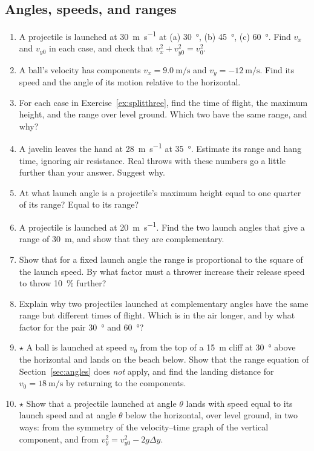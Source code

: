 \documentclass[11pt,twoside,openany]{book}
\newcounter{check}[chapter]
\begin{document}
\subsection*{Angles, speeds, and ranges}
\begin{enumerate}[label=\textbf{\thechapter.\arabic*},resume=exercises,leftmargin=*]
  \item A projectile is launched at \SI{30}{\metre\per\second} at (a) \SI{30}{\degree}, (b) \SI{45}{\degree}, (c) \SI{60}{\degree}. Find $v_x$ and $v_{y0}$ in each case, and check that $v_x^2 + v_{y0}^2 = v_0^2$.\label{ex:splitthree}
  \item A ball's velocity has components $v_x = \SI{9.0}{\metre\per\second}$ and $v_y = \SI{-12}{\metre\per\second}$. Find its speed and the angle of its motion relative to the horizontal.
  \item For each case in Exercise~\ref{ex:splitthree}, find the time of flight, the maximum height, and the range over level ground. Which two have the same range, and why?
  \item A javelin leaves the hand at \SI{28}{\metre\per\second} at \SI{35}{\degree}. Estimate its range and hang time, ignoring air resistance. Real throws with these numbers go a little further than your answer. Suggest why.
  \item At what launch angle is a projectile's maximum height equal to one quarter of its range? Equal to its range?
  \item A projectile is launched at \SI{20}{\metre\per\second}. Find the two launch angles that give a range of \SI{30}{\metre}, and show that they are complementary.
  \item Show that for a fixed launch angle the range is proportional to the square of the launch speed. By what factor must a thrower increase their release speed to throw \SI{10}{\percent} further?
  \item Explain why two projectiles launched at complementary angles have the same range but different times of flight. Which is in the air longer, and by what factor for the pair \SI{30}{\degree} and \SI{60}{\degree}?
  \item $\star$ A ball is launched at speed $v_0$ from the top of a \SI{15}{\metre} cliff at \SI{30}{\degree} above the horizontal and lands on the beach below. Show that the range equation of Section~\ref{sec:angles} does \emph{not} apply, and find the landing distance for $v_0 = \SI{18}{\metre\per\second}$ by returning to the components.
  \item $\star$ Show that a projectile launched at angle $\theta$ lands with speed equal to its launch speed and at angle $\theta$ below the horizontal, over level ground, in two ways: from the symmetry of the velocity--time graph of the vertical component, and from $v_y^2 = v_{y0}^2 - 2g\Delta y$.

\end{enumerate}
\end{document}

